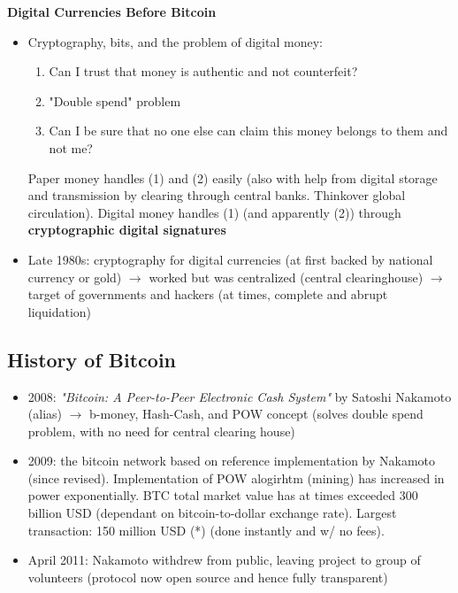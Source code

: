 \documentclass[english, 11pt]{article}
\begin{document}
\begin{tcolorbox}
\textbf{Digital Currencies Before Bitcoin}
\begin{itemize}
    \item Cryptography, bits, and the problem of digital money:
    \begin{enumerate}
        \item Can I trust that money is authentic and not counterfeit?
        \item "Double spend" problem
        \item Can I be sure that no one else can claim this money belongs to them and not me?
    \end{enumerate}
    Paper money handles (1) and (2) easily (also with help from digital storage and transmission by clearing through central banks. Think\eye over global circulation). Digital money handles (1) (and apparently (2)) through \textbf{cryptographic digital signatures}
\end{itemize}
\begin{itemize}
    \item Late 1980s: cryptography for digital currencies (at first backed by national currency or gold) $\rightarrow$ worked but was centralized (central clearinghouse) $\rightarrow$ target of governments and hackers (at times, complete and abrupt liquidation)
\end{itemize}
\end{tcolorbox}

\subsection{History of Bitcoin}
\begin{itemize}
    \item 2008: \textit{"Bitcoin: A Peer-to-Peer Electronic Cash System"} by Satoshi Nakamoto (alias) $\rightarrow$ b-money, Hash-Cash, and POW concept (solves double spend problem, with no need for central clearing house)
    \item 2009: the bitcoin network based on reference implementation by Nakamoto (since revised). Implementation of POW alogirhtm (mining) has increased in power exponentially. BTC total market value has at times exceeded 300 billion USD (dependant on bitcoin-to-dollar exchange rate). Largest transaction: 150 million USD (*) (done instantly and w/ no fees).
    \item April 2011: Nakamoto withdrew from public, leaving project to group of volunteers (protocol now open source and hence fully transparent)
\end{itemize}
    
\end{document}

